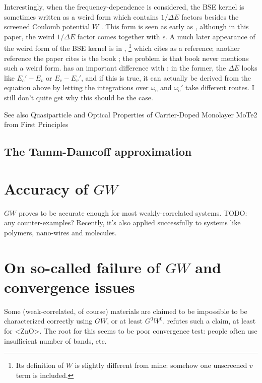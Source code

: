 \documentclass[hyperref, a4paper, 12pt]{report}
\def\ce#1{<#1>}%
\begin{document}
Interestingly, when the frequency-dependence is considered, 
the BSE kernel is sometimes written as a weird form
which contains $1/\Delta E$ factors besides the screened Coulomb potential $W$ 
\cite{rohlfing2000electron}.
This form is seen as early as \cite{strinati1984effects},
although in this paper, the weird $1 / \Delta E$ factor comes together with $\epsilon$.
A much later appearance of the weird form of the BSE kernel 
is in \cite{zhang2023effect},%
\footnote{
    Its definition of $W$ is slightly different from mine: 
    somehow one unscreened $v$ term is included.
}
which cites \cite{rohlfing2000electron} as a reference;
another reference the paper cites is the book \cite{bechstedt2016many};
the problem is that book never mentions such a weird form.
\cite{zhang2023effect} has an important difference with \cite{rohlfing2000electron}:
in the former, the $\Delta E$ looks like $E_c' - E_v$ or $E_c - E_v'$,
and if this is true, it can actually be derived from the equation above 
by letting the integrations over $\omega_{\text{e}}$ and $\omega_{\text{e}}'$ 
take different routes.
I still don't quite get why this should be the case. 

See also Quasiparticle and Optical Properties of Carrier-Doped Monolayer MoTe2 from First Principles

\subsection{The Tamm-Damcoff approximation}



\section{Accuracy of $GW$}


$GW$ proves to be accurate enough for most weakly-correlated systems.
TODO: any counter-examples?
Recently, it's also applied successfully to systems like polymers, nano-wires and molecules.

\section{On so-called failure of $GW$ and convergence issues}

Some (weak-correlated, of course) materials are claimed to be impossible 
to be characterized correctly using $GW$,
or at least $G^0 W^0$.
\cite{shih2010quasiparticle} refutes such a claim, 
at least for \ce{ZnO}.
The root for this seems to be poor convergence test:
people often use insufficient number of bands, etc.
\end{document}
